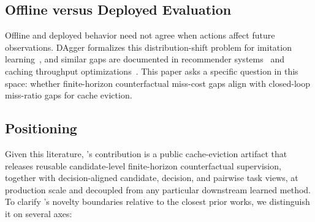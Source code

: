 \subsection{Offline versus Deployed Evaluation}
Offline and deployed behavior need not agree when actions affect future observations. DAgger formalizes this distribution-shift problem for imitation learning~\cite{ross2011dagger}, and similar gaps are documented in recommender systems~\cite{castells2022offline} and caching throughput optimizations~\cite{qiu2026hitratio}. This paper asks a specific question in this space: whether finite-horizon counterfactual miss-cost gaps align with closed-loop miss-ratio gaps for cache eviction.

\subsection{Positioning \lafc}
\label{sec:positioning}

Given this literature, \lafc's contribution is a public cache-eviction
artifact that releases reusable candidate-level finite-horizon
counterfactual supervision, together with decision-aligned candidate, decision,
and pairwise task views, at production scale and decoupled from any particular
downstream learned method. To clarify \lafc's novelty boundaries relative to the
closest prior works, we distinguish it on several axes:

